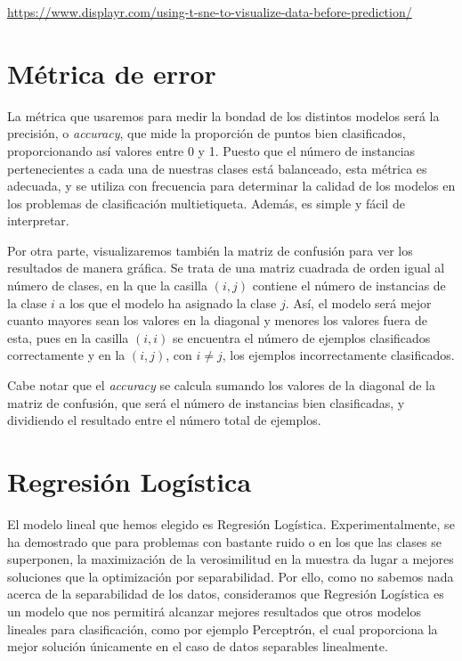 \documentclass[a4]{article}
\begin{document}
 \href{https://www.displayr.com/using-t-sne-to-visualize-data-before-prediction/}{https://www.displayr.com/using-t-sne-to-visualize-data-before-prediction/}
 
\section{Métrica de error}

La métrica que usaremos para medir la bondad de los distintos modelos será la precisión, o \textit{accuracy}, que mide la proporción de puntos bien clasificados, proporcionando así valores entre 0 y 1. Puesto que el número de instancias pertenecientes a cada una de nuestras clases está balanceado, esta métrica es adecuada, y se utiliza con frecuencia para determinar la calidad de los modelos en los problemas de clasificación multietiqueta. Además, es simple y fácil de interpretar. 

Por otra parte, visualizaremos también la matriz de confusión para ver los resultados de manera gráfica.  Se trata de una matriz cuadrada de orden igual al número de clases, en la que la casilla $(i,j)$ contiene el número de instancias de la clase $i$ a los que el modelo ha asignado la clase $j$.  Así, el modelo será mejor cuanto mayores sean los valores en la diagonal y menores los valores fuera de esta, pues en la casilla $(i,i)$ se encuentra el número de ejemplos clasificados correctamente y en la $(i,j)$, con $i\neq j$, los ejemplos incorrectamente clasificados. 

Cabe notar que el \textit{accuracy} se calcula sumando los valores de la diagonal de la matriz de confusión, que será el número de instancias bien clasificadas, y dividiendo el resultado entre el número total de ejemplos. 



\section{Regresión Logística}

El modelo lineal que hemos elegido es Regresión Logística. Experimentalmente, se ha demostrado que para problemas con bastante ruido o en los que las clases se superponen, la maximización de la verosimilitud en la muestra da lugar a mejores soluciones que la optimización por separabilidad. Por ello, como no sabemos nada acerca de la separabilidad de los datos, consideramos que Regresión Logística es un modelo que nos permitirá alcanzar mejores resultados que otros modelos lineales para clasificación, como por ejemplo Perceptrón, el cual proporciona la mejor solución únicamente en el caso de datos separables linealmente. 
\end{document}
